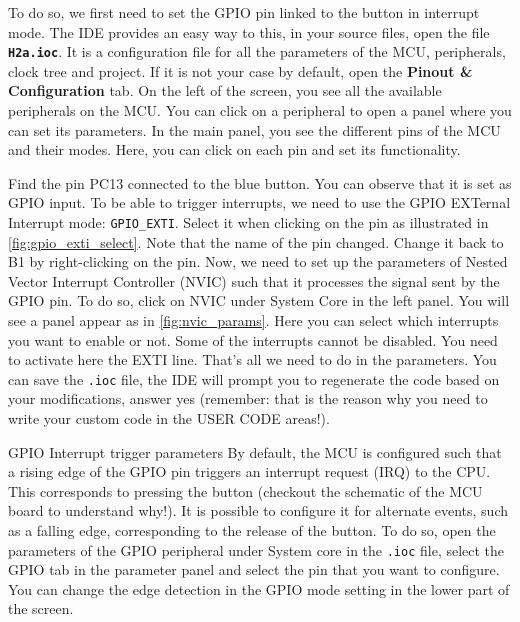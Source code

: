To do so, we first need to set the GPIO pin linked to the button in interrupt mode. The IDE provides an easy way to this, in your source files, open the file \textbf{\texttt{H2a.ioc}}. It is a configuration file for all the parameters of the MCU, peripherals, clock tree and project. If it is not your case by default, open the \textbf{Pinout \& Configuration} tab. On the left of the screen, you see all the available peripherals on the MCU. You can click on a peripheral to open a panel where you can set its parameters. In the main panel, you see the different pins of the MCU and their modes. Here, you can click on each pin and set its functionality.

Find the pin PC13 connected to the blue button. You can observe that it is set as GPIO input. To be able to trigger interrupts, we need to use the GPIO EXTernal Interrupt mode: \texttt{GPIO\_EXTI}. Select it when clicking on the pin as illustrated in \autoref{fig:gpio_exti_select}. Note that the name of the pin changed. Change it back to B1 by right-clicking on the pin. Now, we need to set up the parameters of Nested Vector Interrupt Controller (NVIC) such that it processes the signal sent by the GPIO pin. To do so, click on NVIC under System Core in the left panel. You will see a panel appear as in \autoref{fig:nvic_params}. Here you can select which interrupts you want to enable or not. Some of the interrupts cannot be disabled. You need to activate here the EXTI line. That's all we need to do in the parameters. You can save the \texttt{.ioc} file, the IDE will prompt you to regenerate the code based on your modifications, answer yes (remember: that is the reason why you need to write your custom code in the USER CODE areas!).

\begin{bclogo}[couleur = gray!20, arrondi = 0.2, logo=\bcinfo]{GPIO Interrupt trigger parameters}
By default, the MCU is configured such that a rising edge of the GPIO pin triggers an interrupt request (IRQ) to the CPU. This corresponds to pressing the button (checkout the schematic of the MCU board to understand why!). It is possible to configure it for alternate events, such as a falling edge, corresponding to the release of the button. To do so, open the parameters of the GPIO peripheral under System core in the \texttt{.ioc} file, select the GPIO tab in the parameter panel and select the pin that you want to configure. You can change the edge detection in the GPIO mode setting in the lower part of the screen.
\end{bclogo}

